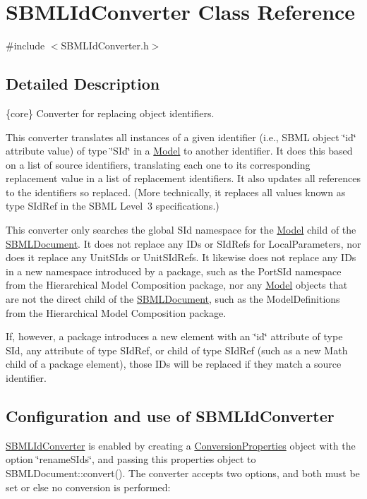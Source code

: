 \hypertarget{class_s_b_m_l_id_converter}{}\section{S\+B\+M\+L\+Id\+Converter Class Reference}
\label{class_s_b_m_l_id_converter}


{\ttfamily \#include $<$S\+B\+M\+L\+Id\+Converter.\+h$>$}



\subsection{Detailed Description}
\{core\} Converter for replacing object identifiers.



This converter translates all instances of a given identifier (i.\+e., S\+B\+ML object \char`\"{}id\char`\"{} attribute value) of type \char`\"{}\+S\+Id\char`\"{} in a \hyperlink{class_model}{Model} to another identifier. It does this based on a list of source identifiers, translating each one to its corresponding replacement value in a list of replacement identifiers. It also updates all references to the identifiers so replaced. (More technically, it replaces all values known as type {\ttfamily S\+Id\+Ref} in the S\+B\+ML Level~3 specifications.)

This converter only searches the global S\+Id namespace for the \hyperlink{class_model}{Model} child of the \hyperlink{class_s_b_m_l_document}{S\+B\+M\+L\+Document}. It does not replace any I\+Ds or S\+Id\+Refs for Local\+Parameters, nor does it replace any Unit\+S\+Ids or Unit\+S\+Id\+Refs. It likewise does not replace any I\+Ds in a new namespace introduced by a package, such as the Port\+S\+Id namespace from the Hierarchical Model Composition package, nor any \hyperlink{class_model}{Model} objects that are not the direct child of the \hyperlink{class_s_b_m_l_document}{S\+B\+M\+L\+Document}, such as the Model\+Definitions from the Hierarchical Model Composition package.

If, however, a package introduces a new element with an \char`\"{}id\char`\"{} attribute of type S\+Id, any attribute of type S\+Id\+Ref, or child of type S\+Id\+Ref (such as a new Math child of a package element), those I\+Ds will be replaced if they match a source identifier.\hypertarget{class_s_b_m_l_id_converter_SBMLIdConverter-usage}{}\subsection{Configuration and use of S\+B\+M\+L\+Id\+Converter}\label{class_s_b_m_l_id_converter_SBMLIdConverter-usage}
\hyperlink{class_s_b_m_l_id_converter}{S\+B\+M\+L\+Id\+Converter} is enabled by creating a \hyperlink{class_conversion_properties}{Conversion\+Properties} object with the option {\ttfamily \char`\"{}rename\+S\+Ids\char`\"{}}, and passing this properties object to S\+B\+M\+L\+Document\+::convert(). The converter accepts two options, and both must be set or else no conversion is performed\+:

